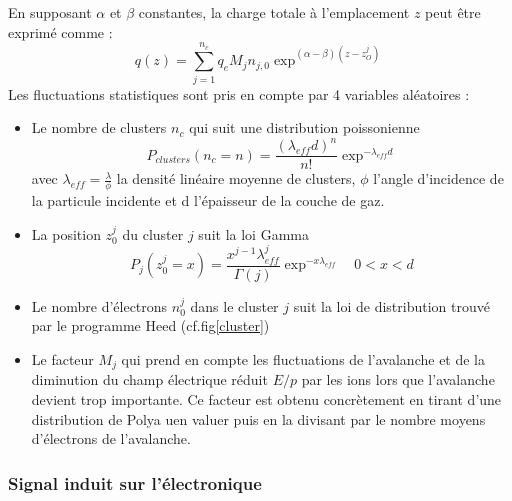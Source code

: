 En supposant $\alpha$ et $\beta$ constantes, la charge totale à l'emplacement $z$ peut être exprimé comme :
\begin{equation}
q(z)=\sum_{j=1}^{n_c}q_{e}M_{j}n_{j,0}\exp^{(\alpha-\beta)(z-z_O^j)}
\end{equation}
Les fluctuations statistiques sont pris en compte par 4 variables aléatoires :
\begin{itemize}[label=$\bullet$]
	\item Le nombre de clusters $n_c$ qui suit une distribution poissonienne 
	\begin{equation}
	P_{clusters}(n_c=n)=\frac{(\lambda_{eff}d)^{n}}{n!}\exp^{-\lambda_{eff}d}
	\end{equation}
	avec $\lambda_{eff}=\frac{\lambda}{\phi}$ la densité linéaire moyenne de clusters, $\phi$ l'angle d'incidence de la particule incidente et d l'épaisseur de la couche de gaz.
	\item La position $z_0^j$ du cluster $j$ suit la loi Gamma
	\begin{equation}
	P_{j}(z_0^j=x)=\frac{x^{j-1}\lambda_{eff}^{j}}{\Gamma(j)}\exp^{-x\lambda_{eff}} \quad 0<x<d
	\end{equation}
	\item Le nombre d'électrons $n_{0}^{j}$ dans le cluster $j$ suit la loi de distribution trouvé par le programme Heed (cf.fig\ref{cluster}) 
	\item Le facteur $M_{j}$ qui prend en compte les fluctuations de l'avalanche et de la diminution du champ électrique réduit $E/p$ par les ions lors que l'avalanche devient trop importante. Ce facteur est obtenu concrètement en tirant d'une distribution de Polya uen valuer puis en la divisant par le nombre moyens d'électrons de l'avalanche.
\end{itemize}

\subsubsection{Signal induit sur l'électronique}
